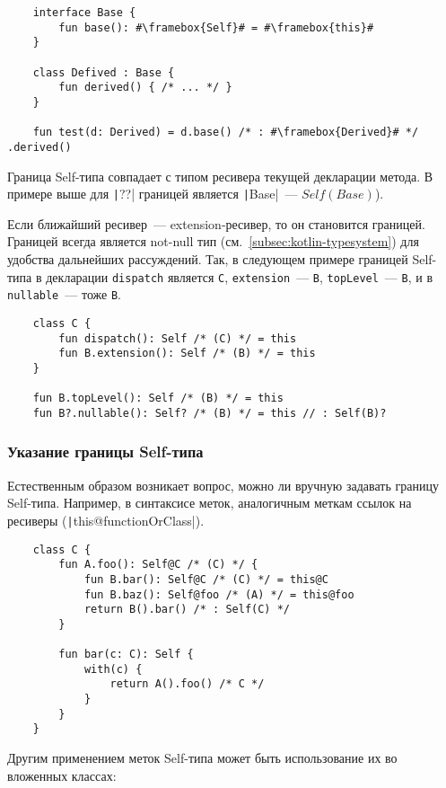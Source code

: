 \begin{verbatim}
    interface Base {
        fun base(): #\framebox{Self}# = #\framebox{this}#
    }

    class Defived : Base {
        fun derived() { /* ... */ }
    }

    fun test(d: Derived) = d.base() /* : #\framebox{Derived}# */ .derived()
\end{verbatim}

Граница Self-типа совпадает с типом ресивера текущей декларации метода.
В примере выше для \texttt|??| границей является \texttt|Base|~--- $Self(Base)$).

Если ближайший ресивер~--- extension-ресивер, то он становится границей.
Границей всегда является not-null тип (см.~\ref{subsec:kotlin-typesystem}) для удобства дальнейших рассуждений.
Так, в следующем примере границей Self-типа в декларации \texttt{dispatch} является \texttt{C}, \texttt{extension}~--- \texttt{B}, \texttt{topLevel}~--- \texttt{B}, и в \texttt{nullable}~--- тоже \texttt{B}.

\begin{verbatim}
    class C {
        fun dispatch(): Self /* (C) */ = this
        fun B.extension(): Self /* (B) */ = this
    }

    fun B.topLevel(): Self /* (B) */ = this
    fun B?.nullable(): Self? /* (B) */ = this // : Self(B)?
\end{verbatim}

\subsubsection{Указание границы Self-типа}

Естественным образом возникает вопрос, можно ли вручную задавать границу Self-типа.
Например, в синтаксисе меток, аналогичным меткам ссылок на ресиверы (\texttt|this@functionOrClass|).

\begin{verbatim}
    class C {
        fun A.foo(): Self@C /* (C) */ {
            fun B.bar(): Self@C /* (C) */ = this@C
            fun B.baz(): Self@foo /* (A) */ = this@foo
            return B().bar() /* : Self(C) */
        }

        fun bar(c: C): Self {
            with(c) {
                return A().foo() /* C */
            }
        }
    }
\end{verbatim}

Другим применением меток Self-типа может быть использование их во вложенных классах:

